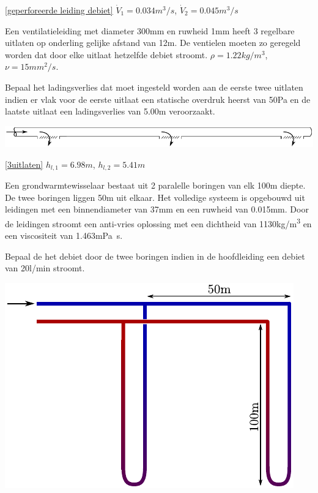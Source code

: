 \begin{antwoord}{\ref{geperforeerde leiding debiet}}
	$\dot{V}_1 = 0.034\unit{m^3/s}$, $\dot{V}_2 = 0.045\unit{m^3/s}$
\end{antwoord}
\begin{toepassing}
	\label{3uitlaten}
Een ventilatieleiding met diameter 300mm en ruwheid 1mm heeft 3 regelbare uitlaten op onderling gelijke afstand van 12m. De ventielen moeten zo geregeld worden dat door elke uitlaat hetzelfde debiet stroomt. $\rho = 1.22\unit{kg/m^3}$, $\nu = 15\unit{mm^2/s}$.
	
Bepaal het ladingsverlies dat moet ingesteld worden aan de eerste twee uitlaten indien er vlak voor de eerste uitlaat een statische overdruk heerst van 50Pa en de laatste uitlaat een ladingsverlies van 5.00m veroorzaakt.

	\centering
	\includegraphics{fig/leidingstelsels/3uitlaten}
\end{toepassing}
\begin{antwoord}{\ref{3uitlaten}}
	$h_{l,1} = 6.98\unit{m}$, $h_{l,2} = 5.41\unit{m}$
\end{antwoord}
\begin{toepassing}[*]
	\label{grondwarmtewisselaar}
Een grondwarmtewisselaar bestaat uit 2 paralelle boringen van elk 100m diepte. De twee boringen liggen 50m uit elkaar. Het volledige systeem is opgebouwd uit leidingen met een binnendiameter van 37mm en een ruwheid van 0.015mm. Door de leidingen stroomt een anti-vries oplossing met een dichtheid van 1130\unit{kg/m^3} en een viscositeit van 1.463\unit{mPa s}.
	
Bepaal de het debiet door de twee boringen indien in de hoofdleiding een debiet van \unit{20}{l/min} stroomt.

	\centering	
	\includegraphics{fig/leidingstelsels/grondwarmtewisselaar}
\end{toepassing}
